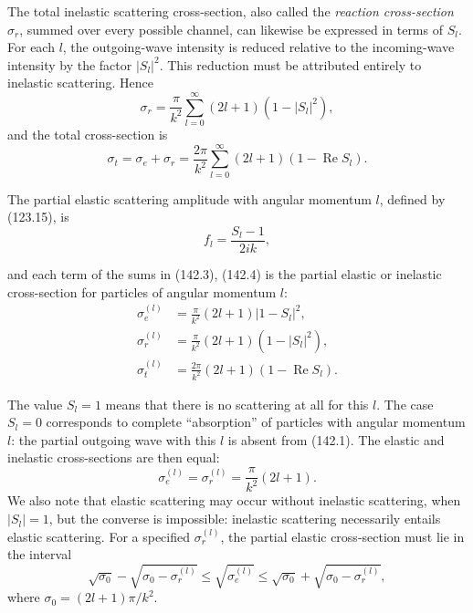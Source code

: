 The total inelastic scattering cross-section, also called the \emph{reaction
cross-section} $\sigma_r$, summed over every possible channel, can likewise be
expressed in terms of $S_l$. For each $l$, the outgoing-wave intensity is
reduced relative to the incoming-wave intensity by the factor $|S_l|^2$.
This reduction must be attributed entirely to inelastic scattering. Hence
\begin{equation}
 \sigma_r=\frac{\pi}{k^2}\sum_{l=0}^{\infty}(2l+1)(1-|S_l|^2),
 \tag{142.4}
\end{equation}
and the total cross-section is
\begin{equation}
 \sigma_t=\sigma_e+\sigma_r
 =\frac{2\pi}{k^2}\sum_{l=0}^{\infty}(2l+1)(1-\operatorname{Re}S_l).
 \tag{142.5}
\end{equation}

The partial elastic scattering amplitude with angular momentum $l$, defined
by (123.15), is
\begin{equation}
 f_l=\frac{S_l-1}{2ik},
 \tag{142.6}
\end{equation}

and each term of the sums in (142.3), (142.4) is the partial elastic or
inelastic cross-section for particles of angular momentum $l$:
\begin{equation}
 \begin{aligned}
 \sigma_e^{(l)}&=\frac{\pi}{k^2}(2l+1)|1-S_l|^2,\\
 \sigma_r^{(l)}&=\frac{\pi}{k^2}(2l+1)(1-|S_l|^2),\\
 \sigma_t^{(l)}&=\frac{2\pi}{k^2}(2l+1)(1-\operatorname{Re}S_l).
 \end{aligned}
 \tag{142.7}
\end{equation}

The value $S_l=1$ means that there is no scattering at all for this $l$. The
case $S_l=0$ corresponds to complete ``absorption'' of particles with angular
momentum $l$: the partial outgoing wave with this $l$ is absent from (142.1).
The elastic and inelastic cross-sections are then equal:
\begin{equation}
 \sigma_e^{(l)}=\sigma_r^{(l)}=\frac{\pi}{k^2}(2l+1).
 \tag{142.8}
\end{equation}
We also note that elastic scattering may occur without inelastic scattering,
when $|S_l|=1$, but the converse is impossible: inelastic scattering
necessarily entails elastic scattering. For a specified
$\sigma_r^{(l)}$, the partial elastic cross-section must lie in the interval
\begin{equation}
 \sqrt{\sigma_0}-\sqrt{\sigma_0-\sigma_r^{(l)}}\leq
 \sqrt{\sigma_e^{(l)}}\leq
 \sqrt{\sigma_0}+\sqrt{\sigma_0-\sigma_r^{(l)}},
 \tag{142.9}
\end{equation}
where $\sigma_0=(2l+1)\pi/k^2$.

